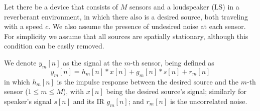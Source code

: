 %
	Let there be a device that consists of $M$ sensors and a loudspeaker (LS) in a reverberant environment, in which there also is a desired source, both traveling with a speed $c$. We also assume the presence of undesired noise at each sensor. For simplicity we assume that all sources are spatially stationary, although this condition can be easily removed.
	
	We denote $y_m[n]$ as the signal at the $m$-th sensor, being defined as
	\begin{equation}
		\label{eq:sec3:time_model_basic}
		y_m[n] = h_m[n] \ast x[n] + g_m[n] \ast s[n] + r_m[n]
	\end{equation}
	in which $h_m[n]$ is the impulse response between the desired source and the $m$-th sensor ($1 \leq m \leq M$), with $x[n]$ being the desired source's signal; similarly for speaker's signal $s[n]$ and its IR $g_m[n]$; and $r_m[n]$ is the uncorrelated noise.
	
